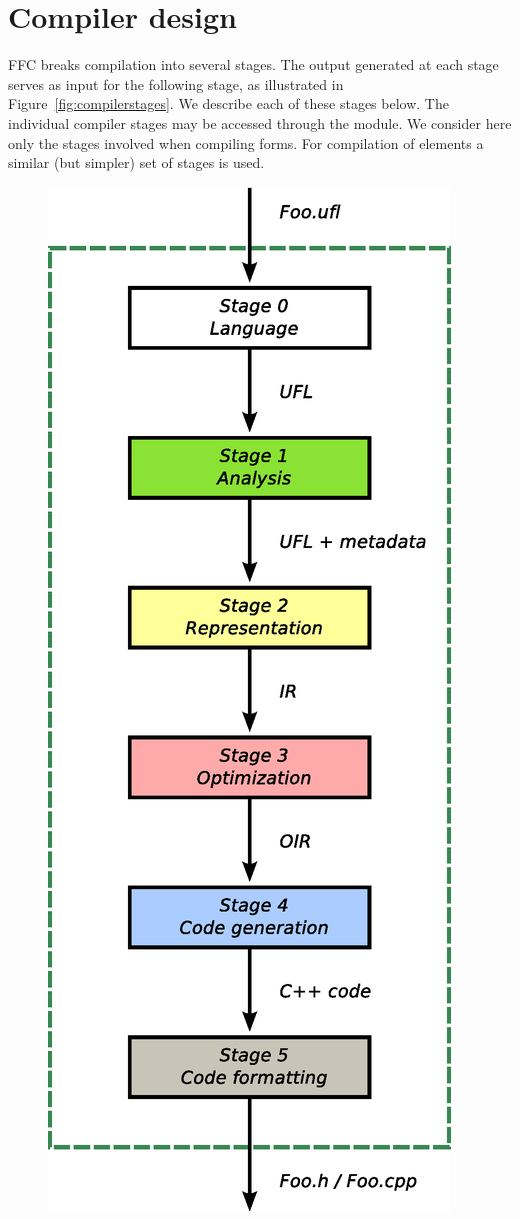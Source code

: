 \section{Compiler design}

FFC breaks compilation into several stages. The output
generated at each stage serves as input for the following stage, as
illustrated in Figure~\ref{fig:compilerstages}. We describe each of
these stages below. The individual compiler stages may be accessed
through the  module. We consider here only the
stages involved when compiling forms. For compilation of elements a
similar (but simpler) set of stages is used.

\begin{figure}
  \begin{center}
    \includegraphics[height=0.8\textheight]{chapters/logg-1/eps/compilerdesign.eps}

\end{center}
\end{figure}
